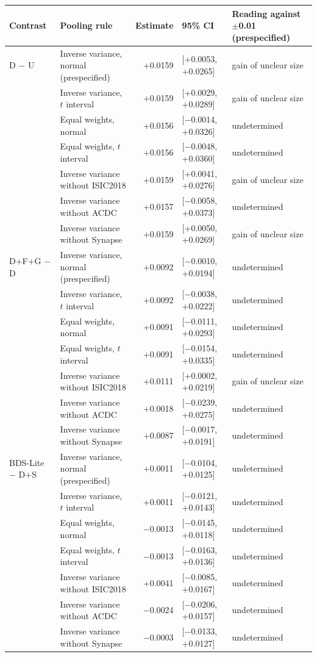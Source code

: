 \begin{tabular}{llrll}
\toprule
Contrast & Pooling rule & Estimate & 95\% CI & Reading against $\pm$0.01 (prespecified) \\
\midrule
D $-$ U & Inverse variance, normal (prespecified) & +0.0159 & [+0.0053, +0.0265] & gain of unclear size \\
 & Inverse variance, $t$ interval & +0.0159 & [+0.0029, +0.0289] & gain of unclear size \\
 & Equal weights, normal & +0.0156 & [$-$0.0014, +0.0326] & undetermined \\
 & Equal weights, $t$ interval & +0.0156 & [$-$0.0048, +0.0360] & undetermined \\
 & Inverse variance without ISIC2018 & +0.0159 & [+0.0041, +0.0276] & gain of unclear size \\
 & Inverse variance without ACDC & +0.0157 & [$-$0.0058, +0.0373] & undetermined \\
 & Inverse variance without Synapse & +0.0159 & [+0.0050, +0.0269] & gain of unclear size \\
\addlinespace
D+F+G $-$ D & Inverse variance, normal (prespecified) & +0.0092 & [$-$0.0010, +0.0194] & undetermined \\
 & Inverse variance, $t$ interval & +0.0092 & [$-$0.0038, +0.0222] & undetermined \\
 & Equal weights, normal & +0.0091 & [$-$0.0111, +0.0293] & undetermined \\
 & Equal weights, $t$ interval & +0.0091 & [$-$0.0154, +0.0335] & undetermined \\
 & Inverse variance without ISIC2018 & +0.0111 & [+0.0002, +0.0219] & gain of unclear size \\
 & Inverse variance without ACDC & +0.0018 & [$-$0.0239, +0.0275] & undetermined \\
 & Inverse variance without Synapse & +0.0087 & [$-$0.0017, +0.0191] & undetermined \\
\addlinespace
BDS-Lite $-$ D+S & Inverse variance, normal (prespecified) & +0.0011 & [$-$0.0104, +0.0125] & undetermined \\
 & Inverse variance, $t$ interval & +0.0011 & [$-$0.0121, +0.0143] & undetermined \\
 & Equal weights, normal & $-$0.0013 & [$-$0.0145, +0.0118] & undetermined \\
 & Equal weights, $t$ interval & $-$0.0013 & [$-$0.0163, +0.0136] & undetermined \\
 & Inverse variance without ISIC2018 & +0.0041 & [$-$0.0085, +0.0167] & undetermined \\
 & Inverse variance without ACDC & $-$0.0024 & [$-$0.0206, +0.0157] & undetermined \\
 & Inverse variance without Synapse & $-$0.0003 & [$-$0.0133, +0.0127] & undetermined \\
\bottomrule
\end{tabular}
